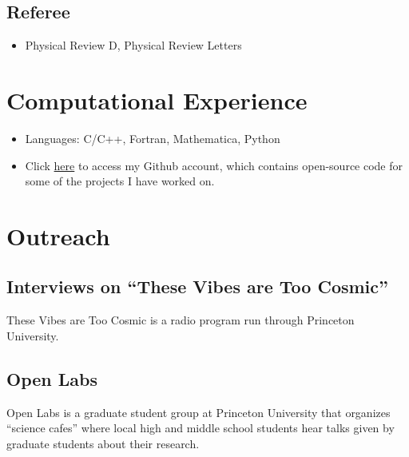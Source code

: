 \documentclass{my_cv}
\begin{document}
\subsection{Referee}
\begin{itemize}
\item Physical Review D, Physical Review Letters
\end{itemize}
\section{Computational Experience}
\begin{itemize}
\item Languages: C/C++, Fortran, Mathematica, Python 
\item Click \href{https://github.com/JLRipley314}{here} to
      access my Github account, which contains open-source code for
      some of the projects I have worked on.
\end{itemize}
\section{Outreach}
\subsection{Interviews on ``These Vibes are Too Cosmic''}
	These Vibes are Too Cosmic is a radio program run through
	Princeton University.
\begin{itemize}
\end{itemize}
\subsection{Open Labs}
	Open Labs is a graduate student group at Princeton University
that organizes ``science cafes''
where local high and middle school students hear talks given by graduate
students about their research.
\begin{itemize}
\end{itemize}
\end{document}

